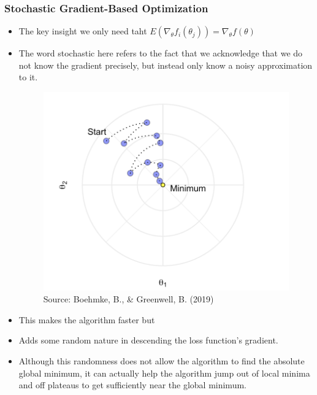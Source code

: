 \documentclass[
  shownotes,
  xcolor={svgnames},
  hyperref={colorlinks,citecolor=DarkBlue,linkcolor=DarkRed,urlcolor=DarkBlue}
  , aspectratio=169]{beamer}
\begin{document}
\begin{frame}[fragile]
\frametitle{Stochastic Gradient-Based Optimization}
\begin{itemize}
 \item The key insight we only need taht $E(\nabla_{\theta} f_i(\theta_j))=\nabla_{\theta} f(\theta)$ 
\item  The word stochastic here refers to the fact that we acknowledge that we do not know the gradient precisely, but instead only know a noisy approximation to it. 



\begin{figure}[H] \centering
  \centering
  \includegraphics[scale=0.3]{figures/sgd.png}
  \\
  \tiny
  Source: Boehmke, B., \& Greenwell, B. (2019)
\end{figure}

\footnotesize
\item This makes the algorithm faster but 
\item Adds some random nature in descending the loss function’s gradient. 
\item Although this randomness does not allow the algorithm to find the absolute global minimum, it can actually help the algorithm jump out of local minima and off plateaus to get sufficiently near the global minimum.
\end{itemize}
\end{frame}
\end{document}
